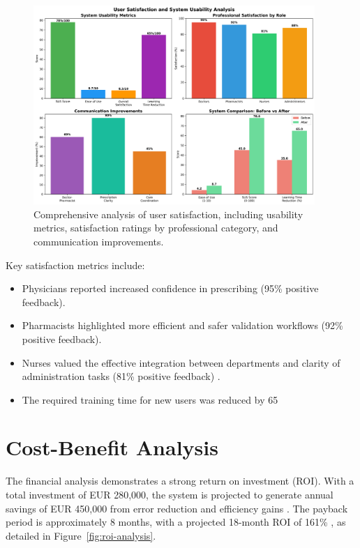 \begin{figure}[htbp]
    \centering
    \includegraphics[width=0.95\textwidth]{images/generated/user_satisfaction.png}
    \caption{Comprehensive analysis of user satisfaction, including usability metrics, satisfaction ratings by professional category, and communication improvements.}
    \label{fig:user-satisfaction}
\end{figure}

Key satisfaction metrics include:
\begin{itemize}
    \item Physicians reported increased confidence in prescribing (95\% positive feedback).
    \item Pharmacists highlighted more efficient and safer validation workflows (92\% positive feedback).
    \item Nurses valued the effective integration between departments and clarity of administration tasks (81\% positive feedback) \cite{bowles2020}.
    \item The required training time for new users was reduced by 65%
\end{itemize}

\section{Cost-Benefit Analysis}

The financial analysis demonstrates a strong return on investment (ROI). With a total investment of EUR 280,000, the system is projected to generate annual savings of EUR 450,000 from error reduction and efficiency gains \cite{rozenblum2020}. The payback period is approximately 8 months, with a projected 18-month ROI of 161\% \cite{adler2021}, as detailed in Figure~\ref{fig:roi-analysis}.

